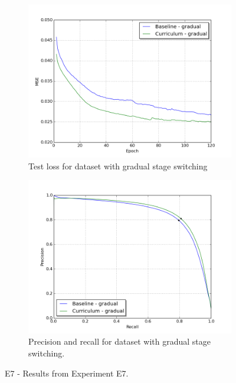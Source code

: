 \begin{figure}[p]
\begin{subfigure}{0.48\textwidth}
\includegraphics[width=\linewidth]{figs/E7/E7_lc_gradual.png}
\caption{Test loss for dataset with gradual stage switching} \label{fig:E7_gradual_loss}
\end{subfigure}
\hspace*{\fill} %
\begin{subfigure}{0.48\textwidth}
\includegraphics[width=\linewidth]{figs/E7/E7_pr_gradual.png}
\caption{Precision and recall for dataset with gradual stage switching.} \label{fig:E7_gradual_pr}
\end{subfigure}
\hspace*{\fill} %
\caption{E7 - Results from Experiment E7.} \label{fig:E7_curriculum_inexperienced}
\end{figure}

